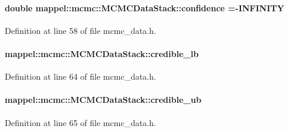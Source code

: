 \paragraph[{\texorpdfstring{confidence}{confidence}}]{\setlength{\rightskip}{0pt plus 5cm}double mappel\+::mcmc\+::\+M\+C\+M\+C\+Data\+Stack\+::confidence =-\/I\+N\+F\+I\+N\+I\+TY}\hypertarget{structmappel_1_1mcmc_1_1MCMCDataStack_a664569d1071a89e5578e9caf90fb04d5}{}\label{structmappel_1_1mcmc_1_1MCMCDataStack_a664569d1071a89e5578e9caf90fb04d5}


Definition at line 58 of file mcmc\+\_\+data.\+h.

\paragraph[{\texorpdfstring{credible\+\_\+lb}{credible_lb}}]{ mappel\+::mcmc\+::\+M\+C\+M\+C\+Data\+Stack\+::credible\+\_\+lb}\hypertarget{structmappel_1_1mcmc_1_1MCMCDataStack_aea5d186cffe2ecf57918ef42e975211b}{}\label{structmappel_1_1mcmc_1_1MCMCDataStack_aea5d186cffe2ecf57918ef42e975211b}


Definition at line 64 of file mcmc\+\_\+data.\+h.

\paragraph[{\texorpdfstring{credible\+\_\+ub}{credible_ub}}]{ mappel\+::mcmc\+::\+M\+C\+M\+C\+Data\+Stack\+::credible\+\_\+ub}\hypertarget{structmappel_1_1mcmc_1_1MCMCDataStack_a57d33342ed7a3fb6fdf7b55a99254369}{}\label{structmappel_1_1mcmc_1_1MCMCDataStack_a57d33342ed7a3fb6fdf7b55a99254369}


Definition at line 65 of file mcmc\+\_\+data.\+h.

